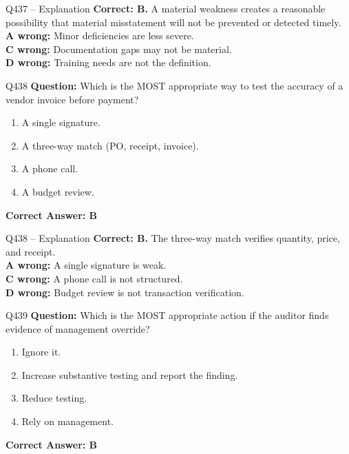 \documentclass[aspectratio=169,10pt]{beamer}
\begin{document}
	\begin{frame}[t]{Q437 -- Explanation}
		\small
		\textbf{Correct: B.} A material weakness creates a reasonable possibility that material misstatement will not be prevented or detected timely. \\[4pt]
		\textbf{A wrong:} Minor deficiencies are less severe. \\[2pt]
		\textbf{C wrong:} Documentation gaps may not be material. \\[2pt]
		\textbf{D wrong:} Training needs are not the definition.
	\end{frame}
	
	\begin{frame}[t]{Q438}
		\small
		\textbf{Question:} Which is the MOST appropriate way to test the accuracy of a vendor invoice before payment?
		\begin{enumerate}[label=\Alph*.,itemsep=1pt,topsep=2pt]
			\item A single signature.
			\item A three-way match (PO, receipt, invoice).
			\item A phone call.
			\item A budget review.
		\end{enumerate}
		\vspace{4pt}
		\textbf{Correct Answer: B}
	\end{frame}
	
	\begin{frame}[t]{Q438 -- Explanation}
		\small
		\textbf{Correct: B.} The three-way match verifies quantity, price, and receipt. \\[4pt]
		\textbf{A wrong:} A single signature is weak. \\[2pt]
		\textbf{C wrong:} A phone call is not structured. \\[2pt]
		\textbf{D wrong:} Budget review is not transaction verification.
	\end{frame}
	
	\begin{frame}[t]{Q439}
		\small
		\textbf{Question:} Which is the MOST appropriate action if the auditor finds evidence of management override?
		\begin{enumerate}[label=\Alph*.,itemsep=1pt,topsep=2pt]
			\item Ignore it.
			\item Increase substantive testing and report the finding.
			\item Reduce testing.
			\item Rely on management.
		\end{enumerate}
		\vspace{4pt}
		\textbf{Correct Answer: B}
	\end{frame}
	
\end{document}
